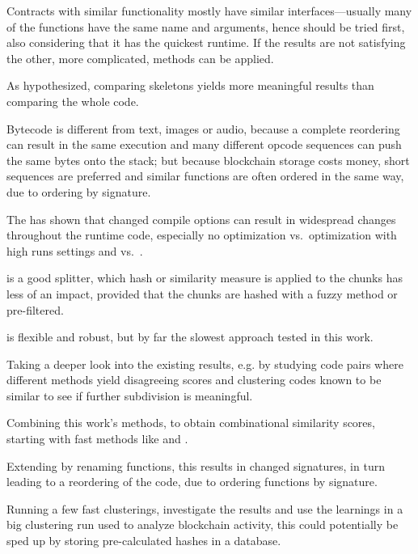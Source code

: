 \documentclass[../main.tex]{subfiles}
\begin{document}
Contracts with similar functionality mostly have similar interfaces---usually many of the functions have the same name and arguments, hence  should be tried first, also considering that it has the quickest runtime. If the results are not satisfying the other, more complicated, methods can be applied.

As hypothesized, comparing skeletons yields more meaningful results than comparing the whole code.

Bytecode is different from text, images or audio, because a complete reordering can result in the same execution and many different opcode sequences can push the same bytes onto the stack; but because blockchain storage costs money, short sequences are preferred and similar functions are often ordered in the same way, due to  ordering by signature.

The \n{\solcts} has shown that changed compile options can result in widespread changes throughout the runtime code, especially no optimization vs.\ optimization with high runs settings and   vs.\ .

 is a good splitter, which hash or similarity measure is applied to the chunks has less of an impact, provided that the chunks are hashed with a fuzzy method or pre-filtered.

 is flexible and robust, but by far the slowest approach tested in this work.

Taking a deeper look into the existing results, e.g. by studying code pairs where different methods yield disagreeing scores and clustering codes known to be similar to see if further subdivision is meaningful.

Combining this work's methods, to obtain combinational similarity scores, starting with fast methods like  and .

Extending \n{\solcts} by renaming functions, this results in changed  signatures, in turn leading to a reordering of the code, due to  ordering functions by signature.

Running a few fast clusterings, investigate the results and use the learnings in a big clustering run used to analyze blockchain activity, this could potentially be sped up by storing pre-calculated hashes in a database.
\end{document}
